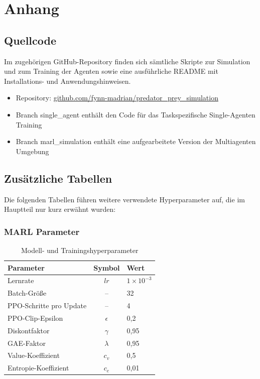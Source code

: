 \appendix
\label{chap:appendix}
\chapter{Anhang}

\section{Quellcode}
\label{app:code}

Im zugehörigen GitHub-Repository finden sich sämtliche Skripte zur Simulation und zum Training der Agenten sowie eine ausführliche README mit Installations- und Anwendungshinweisen. 

\begin{itemize}
  \item Repository: \href{https://github.com/fynn-madrian/predator_prey_simulation}{github.com/fynn-madrian/predator\_prey\_simulation}
  \item Branch single\_agent enthält den Code für das Taskspezifische Single-Agenten Training
  \item Branch marl\_simulation enthält eine aufgearbeitete Version der Multiagenten Umgebung
\end{itemize}

\section{Zusätzliche Tabellen}
\label{app:tables}

Die folgenden Tabellen führen weitere verwendete Hyperparameter auf, die im Hauptteil nur kurz erwähnt wurden:

\subsection{MARL Parameter}
\begin{table}[htbp]
  \centering
  \caption{Modell- und Trainingshyperparameter}
  \label{tab:marl_model_hyperparams}
  \begin{tabular}{@{}lcl@{}}
    \toprule
    Parameter                         & Symbol            & Wert          \\
    \midrule
    Lernrate                          & $lr$              & $1\times10^{-3}$ \\
    Batch-Größe                       & –                 & 32            \\
    PPO-Schritte pro Update           & –                 & 4             \\
    PPO-Clip-Epsilon                  & $\epsilon$        & 0,2           \\
    Diskontfaktor                     & $\gamma$          & 0,95          \\
    GAE-Faktor                        & $\lambda$         & 0,95          \\
    Value-Koeffizient                 & $c_v$             & 0,5           \\
    Entropie-Koeffizient              & $c_e$             & 0,01          \\
    \bottomrule
  \end{tabular}
\end{table}


